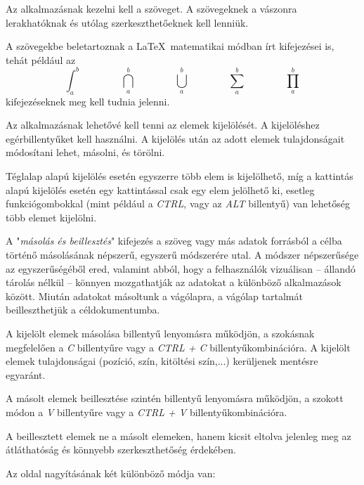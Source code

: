 
Az alkalmazásnak kezelni kell a szöveget. A szövegeknek a vászonra lerakhatóknak és utólag szerkeszthetőeknek kell lenniük. 

A szövegekbe beletartoznak a \LaTeX\ matematikai módban írt kifejezései is, tehát például az $$ \int_{a}^{b} \qquad\qquad \bigcap_{a}^{b} \qquad\qquad \bigcup_{a}^{b} \qquad\qquad \sum_{a}^{b} \qquad\qquad \prod_{a}^{b}$$ kifejezéseknek meg kell tudnia jelenni.


Az alkalmazásnak lehetővé kell tenni az elemek kijelölését. A kijelöléshez egérbillentyűket kell használni. A kijelölés után az adott elemek tulajdonságait módosítani lehet, másolni, és törölni. 

 Téglalap alapú kijelölés esetén egyszerre több elem is kijelölhető, míg a kattintás alapú kijelölés esetén egy kattintással csak egy elem jelölhető ki, esetleg funkciógombokkal (mint például a \textit{CTRL}, vagy az \textit{ALT} billentyű) van lehetőség több elemet kijelölni.


A "\textit{másolás és beillesztés}" kifejezés a szöveg vagy más adatok forrásból a célba történő másolásának népszerű, egyszerű módszerére utal. A módszer népszerűsége az egyszerűségéből ered, valamint abból, hogy a felhasználók vizuálisan -- állandó tárolás nélkül -- könnyen mozgathatják az adatokat a különböző alkalmazások között. Miután adatokat másoltunk a vágólapra, a vágólap tartalmát beilleszthetjük a céldokumentumba.


A kijelölt elemek másolása billentyű lenyomásra működjön, a szokásnak megfelelően a \textit{C} billentyűre vagy a \textit{CTRL + C} billentyűkombinációra. A kijelölt elemek tulajdonságai (pozíció, szín, kitöltési szín,...) kerüljenek mentésre egyaránt. 


A másolt elemek beillesztése szintén billentyű lenyomásra működjön, a szokott módon a \textit{V} billentyűre vagy a \textit{CTRL + V} billentyűkombinációra. 

A beillesztett elemek ne a másolt elemeken, hanem kicsit eltolva jelenleg meg az átláthatóság és könnyebb szerkeszthetőség érdekében.


Az oldal nagyításának két különböző módja van:

